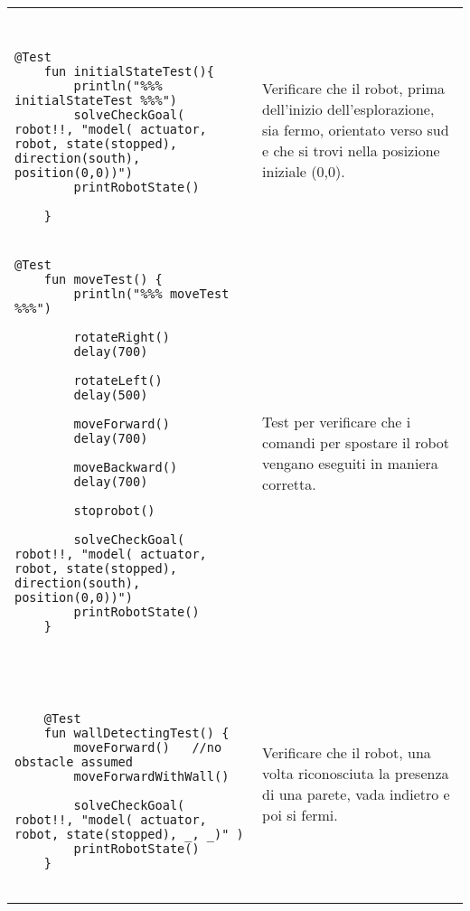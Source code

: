 \begin{center}

\noindent
\begin{tabular}{|@{}p{10cm}|p{4cm}|}
\hline\\
  &   \\
\begin{lstlisting}[backgroundcolor=\color{white} ]

@Test
	fun initialStateTest(){
		println("%%% initialStateTest %%%")
		solveCheckGoal( robot!!, "model( actuator, robot, state(stopped), direction(south), position(0,0))")
		printRobotState()
		
	}
\end{lstlisting} & Verificare che il robot, prima dell'inizio dell'esplorazione, sia fermo, orientato verso sud e che si trovi nella posizione iniziale (0,0). \\

\hline

\begin{lstlisting}[backgroundcolor=\color{white} ]
@Test
	fun moveTest() {
		println("%%% moveTest  %%%")
		
		rotateRight()
		delay(700)
		
		rotateLeft()
		delay(500)
		
		moveForward()
		delay(700)
		
		moveBackward()
		delay(700)
		
		stoprobot()
		
		solveCheckGoal( robot!!, "model( actuator, robot, state(stopped), direction(south), position(0,0))")
		printRobotState()
 	}
	
\end{lstlisting} & \vspace{0.5ex} Test per verificare che i comandi per spostare il robot vengano eseguiti in maniera corretta. \\

\hline

\begin{lstlisting}[backgroundcolor=\color{white}]


	@Test
	fun wallDetectingTest() {
		moveForward()	//no obstacle assumed
		moveForwardWithWall()
		
		solveCheckGoal( robot!!, "model( actuator, robot, state(stopped), _, _)" )
		printRobotState()
	}


\end{lstlisting} &  \vspace{0.5ex} Verificare che il robot, una volta riconosciuta la presenza di una parete, vada indietro e poi si fermi.\\

\hline
\end{tabular}
\end{center}

